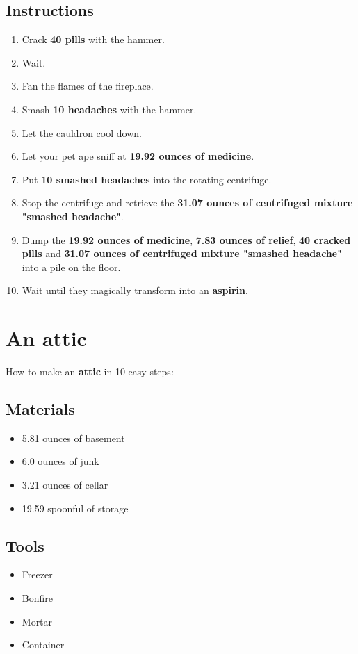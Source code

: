 \documentclass{article}
\begin{document}
\subsection{Instructions}\begin{enumerate}
\item 
Crack \textbf{40 pills} with the hammer.
\item 
Wait.
\item 
Fan the flames of the fireplace.
\item 
Smash \textbf{10 headaches} with the hammer.
\item 
Let the cauldron cool down.
\item 
Let your pet ape sniff at \textbf{19.92 ounces of medicine}.
\item 
Put \textbf{10 smashed headaches} into the rotating centrifuge.
\item 
Stop the centrifuge and retrieve the \textbf{31.07 ounces of centrifuged mixture "smashed headache"}.
\item 
Dump the \textbf{19.92 ounces of medicine}, \textbf{7.83 ounces of relief}, \textbf{40 cracked pills} and \textbf{31.07 ounces of centrifuged mixture "smashed headache"} into a pile on the floor.
\item 
Wait until they magically transform into an \textbf{aspirin}.
\end{enumerate}
\newpage
\section{An attic}How to make an \textbf{attic} in 10 easy steps:

\subsection{Materials}\begin{itemize}
\item 
5.81 ounces of basement
\item 
6.0 ounces of junk
\item 
3.21 ounces of cellar
\item 
19.59 spoonful of storage
\end{itemize}
\subsection{Tools}\begin{itemize}
\item 
Freezer
\item 
Bonfire
\item 
Mortar
\item 
Container
\end{itemize}
\end{document}

